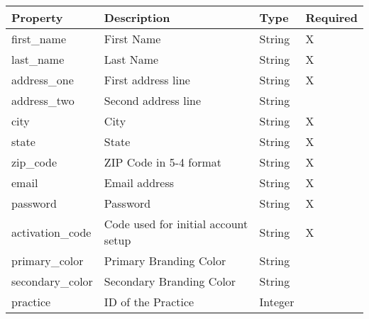 \documentclass[letterpaper,10pt,english]{sphinxmanual}
\begin{document}
\begin{tabulary}{\linewidth}{|L|L|L|L|}
\hline
\textsf{\relax 
Property
} & \textsf{\relax 
Description
} & \textsf{\relax 
Type
} & \textsf{\relax 
Required
}\\
\hline
first\_name
 & 
First Name
 & 
String
 & 
X
\\

last\_name
 & 
Last Name
 & 
String
 & 
X
\\

address\_one
 & 
First address line
 & 
String
 & 
X
\\

address\_two
 & 
Second address line
 & 
String
 & \\

city
 & 
City
 & 
String
 & 
X
\\

state
 & 
State
 & 
String
 & 
X
\\

zip\_code
 & 
ZIP Code in 5-4 format
 & 
String
 & 
X
\\

email
 & 
Email address
 & 
String
 & 
X
\\

password
 & 
Password
 & 
String
 & 
X
\\

activation\_code
 & 
Code used for initial account
setup
 & 
String
 & 
X
\\

primary\_color
 & 
Primary Branding Color
 & 
String
 & \\

secondary\_color
 & 
Secondary Branding Color
 & 
String
 & \\

practice
 & 
ID of the Practice
 & 
Integer
 & \\
\hline\end{tabulary}
\end{document}
